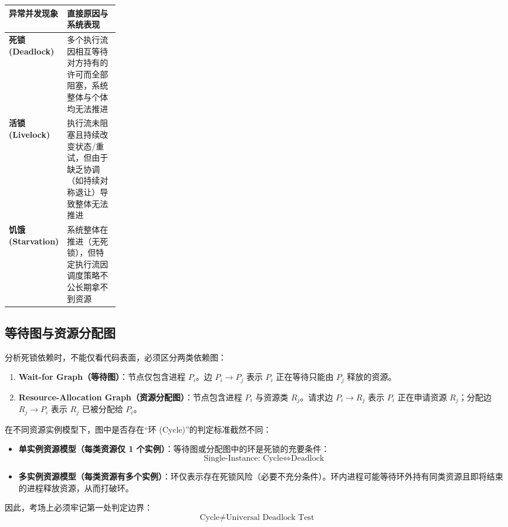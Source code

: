 \documentclass[11pt,a4paper]{ctexart}
\newcommand{\kw}[1]{\textbf{#1}}
\begin{document}
\begingroup
\small
\renewcommand{\arraystretch}{1.25}
\setlength{\tabcolsep}{6pt}
\begin{tabularx}{\linewidth}{>{\bfseries}p{0.22\linewidth} X}
\toprule
异常并发现象 & 直接原因与系统表现\\
\midrule
死锁 (Deadlock) & 多个执行流因相互等待对方持有的许可而全部阻塞，系统整体与个体均无法推进\\
活锁 (Livelock) & 执行流未阻塞且持续改变状态/重试，但由于缺乏协调（如持续对称退让）导致整体无法推进\\
饥饿 (Starvation) & 系统整体在推进（无死锁），但特定执行流因调度策略不公长期拿不到资源\\
\bottomrule
\end{tabularx}
\endgroup

\subsection{等待图与资源分配图}

\begin{center}

\end{center}

分析死锁依赖时，不能仅看代码表面，必须区分两类依赖图：

\begin{enumerate}
\item \kw{Wait-for Graph（等待图）}：节点仅包含进程 $P_i$。边 $P_i \to P_j$ 表示 $P_i$ 正在等待只能由 $P_j$ 释放的资源。
\item \kw{Resource-Allocation Graph（资源分配图）}：节点包含进程 $P_i$ 与资源类 $R_j$。请求边 $P_i \to R_j$ 表示 $P_i$ 正在申请资源 $R_j$；分配边 $R_j \to P_i$ 表示 $R_j$ 已被分配给 $P_i$。
\end{enumerate}

在不同资源实例模型下，图中是否存在“环 (Cycle)”的判定标准截然不同：

\begin{itemize}
\item \kw{单实例资源模型（每类资源仅 1 个实例）}：等待图或分配图中的环是死锁的充要条件：
\[
\boxed{\text{Single-Instance: } \text{Cycle} \iff \text{Deadlock}}
\]
\item \kw{多实例资源模型（每类资源有多个实例）}：环仅表示存在死锁风险（必要不充分条件）。环内进程可能等待环外持有同类资源且即将结束的进程释放资源，从而打破环。
\end{itemize}

因此，考场上必须牢记第一处判定边界：
\[
\boxed{\text{Cycle} \neq \text{Universal Deadlock Test}}
\]
\end{document}

